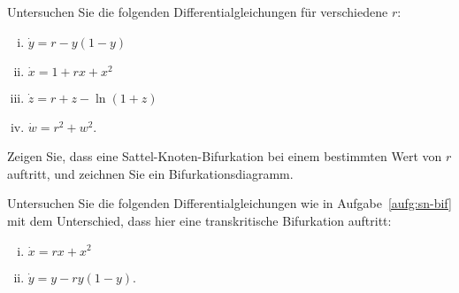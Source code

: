 \documentclass[11pt,a4paper]{article}
\begin{document}




\begin{aufg}\label{aufg:sn-bif}
 Untersuchen Sie die folgenden Differentialgleichungen für verschiedene $r$:
 \begin{enumerate}[(i)]
  \item $\dot{y} = r-y(1-y)$
  \item $\dot{x} = 1 + rx + x^2$
  \item $\dot{z} = r + z - \ln(1+z)$
  \item $\dot{w} = r^2 + w^2$.
 \end{enumerate}
 Zeigen Sie, dass eine Sattel-Knoten-Bifurkation bei einem bestimmten Wert von
 $r$ auftritt, und zeichnen Sie ein Bifurkationsdiagramm.
\end{aufg}

\bigskip%

\begin{aufg}
 Untersuchen Sie die folgenden Differentialgleichungen wie in
 Aufgabe~\ref{aufg:sn-bif} mit dem Unterschied, dass hier eine transkritische
 Bifurkation auftritt:
 \begin{enumerate}[(i)]
  \item $\dot{x} = rx + x^2$
  \item $\dot{y} = y - ry(1-y)$.
 \end{enumerate}
\end{aufg}

\bigskip%
\end{document}
